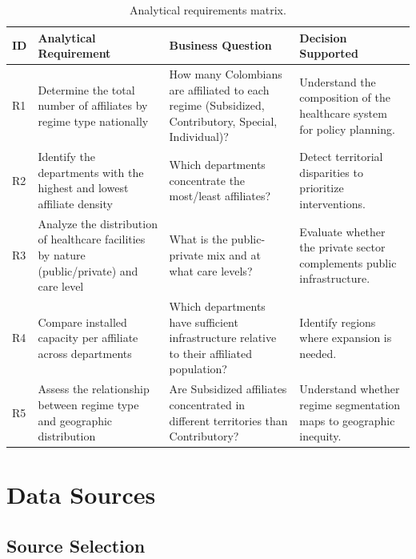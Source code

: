 \documentclass[12pt,a4paper]{article}
\begin{document}
\begin{table}[H]
\centering
\small
\begin{tabularx}{\textwidth}{p{1cm} X X X}
\toprule
\textbf{ID} & \textbf{Analytical Requirement} & \textbf{Business Question} & \textbf{Decision Supported}\\
\midrule
R1 & Determine the total number of affiliates by regime type nationally & How many Colombians are affiliated to each regime (Subsidized, Contributory, Special, Individual)? & Understand the composition of the healthcare system for policy planning.\\
\addlinespace
R2 & Identify the departments with the highest and lowest affiliate density & Which departments concentrate the most/least affiliates? & Detect territorial disparities to prioritize interventions.\\
\addlinespace
R3 & Analyze the distribution of healthcare facilities by nature (public/private) and care level & What is the public-private mix and at what care levels? & Evaluate whether the private sector complements public infrastructure.\\
\addlinespace
R4 & Compare installed capacity per affiliate across departments & Which departments have sufficient infrastructure relative to their affiliated population? & Identify regions where expansion is needed.\\
\addlinespace
R5 & Assess the relationship between regime type and geographic distribution & Are Subsidized affiliates concentrated in different territories than Contributory? & Understand whether regime segmentation maps to geographic inequity.\\
\bottomrule
\end{tabularx}
\caption{Analytical requirements matrix.}
\end{table}

\section{Data Sources}

\subsection{Source Selection}
\end{document}
